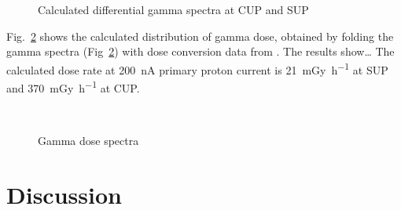 \documentclass[12pt,journal]{IEEEtran}
\let\MYoriglatexcaption\caption
\renewcommand{\caption}[2][\relax]{\MYoriglatexcaption[#2]{#2}}
\begin{document}
\begin{figure}
    \centering
    \vspace{2in}
    \hspace{\columnwidth}
    \caption{Calculated differential gamma spectra at CUP and SUP}
    \label{fig:DifferentialGammaSpectra}
\end{figure}

Fig.~\ref{fig:GammaDoseEnergy} shows the calculated distribution of gamma dose, obtained by folding the gamma spectra (Fig~\ref{fig:GammaDoseEnergy}) with dose conversion data from \cite{tbd}.
The results show\ldots{}
The calculated dose rate at \SI{200}{\nA} primary proton current is \SI{21}{\milli\gray\per\hour} at SUP and \SI{370}{\milli\gray\per\hour} at CUP.

\begin{figure}
    \centering
    \vspace{2in}
    \\
    \caption{Gamma dose spectra}
    \label{fig:GammaDoseEnergy}
\end{figure}


\section{Discussion}

\ifCLASSOPTIONcaptionsoff
  \newpage
\fi

\end{document}
